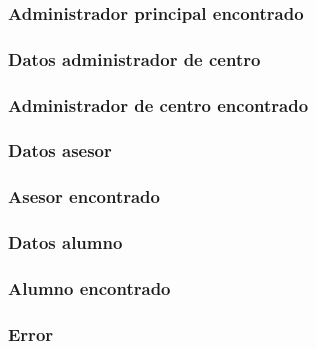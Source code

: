   

  \subsubsection{Administrador principal encontrado}

  

  \subsubsection{Datos administrador de centro}

  

  \subsubsection{Administrador de centro encontrado}

  

  \subsubsection{Datos asesor}

  

  \subsubsection{Asesor encontrado}

  

  \subsubsection{Datos alumno}

  

  \subsubsection{Alumno encontrado}

  

  \subsubsection{Error}

  